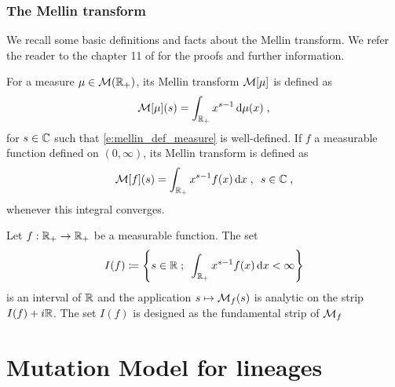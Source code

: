 \documentclass[11pt]{amsart}
\newcommand{\R}{\RR}
\newcommand{\diff}{\,\mathrm{d}}
\begin{document}
\subsubsection{The Mellin transform}

We recall some basic definitions and facts about the Mellin transform. We refer the reader to the chapter 11 of \cite{misra1986transform} for the proofs and further information. 

\begin{definition} For a measure $\mu \in \Mcal(\R_+)$, its Mellin transform $\mathcal{M}[\mu]$ is defined as 
\begin{equation}
        \label{e:mellin_def_measure}
        \Mcal[\mu](s) = \int_{\RR_+} x^{s-1} \diff \mu(x) \eqfinv
    \end{equation}
    for $s \in \mathbb{C}$ such that \eqref{e:mellin_def_measure} is well-defined.     
If $f$ a measurable function defined on $(0, \infty)$, its Mellin transform is defined as 
\begin{equation}
    \label{e:mellin_def_function}
    \Mcal[f](s) = \int_{\RR_+} x^{s-1} f(x) \diff x 
    \eqsepv
    s \in \CC
    \eqfinv
\end{equation}
whenever this integral converges. 
\end{definition}

\begin{lemma}\label{lm:interval_mellin}
    Let $f : \mathbb{R}_+ \to \mathbb{R}_+$ be a measurable function. The set 
    $$
    I(f) \coloneqq \left\{ s \in \RR \eqseppv \int_{\RR_+} x^{s-1} f(x) \diff x < \infty \right\}
    $$ 
    is an interval of $\mathbb{R}$ and the application $s \mapsto \mathcal{M}_f(s)$ is analytic on the strip $I(f) + i\mathbb{R}$. 
    The set $I(f)$ is designed as the fundamental strip of $\mathcal{M}_f$
\end{lemma}

\section{Mutation Model for lineages}
\label{s:lineage}
\end{document}
